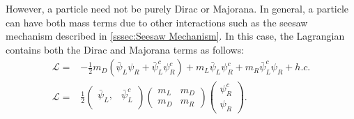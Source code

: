 However, a particle need not be purely Dirac or Majorana. In general, a particle can have both mass terms due to other interactions such as the seesaw mechanism described in \autoref{sssec:Seesaw Mechanism}. In this case, the Lagrangian contains both the Dirac and Majorana terms as follows:
\begin{align}
\mathcal{L} = & -\frac{1}{2}m_D(\bar{\psi}_L\psi_R+\bar{\psi}^c_L\psi^c_R)+m_L\bar{\psi}_L\psi^c_R+m_R\bar{\psi}^c_L\psi_R +h.c. \\
\mathcal{L} = &\frac{1}{2} \begin{pmatrix}
\bar{\psi}_L,& \bar{\psi}^c_L \\
\end{pmatrix} \begin{pmatrix}
m_L & m_D \\
m_D & m_R
\end{pmatrix}
\begin{pmatrix}
\psi^c_R \\
\psi_R
\end{pmatrix}.
\label{eq:DiracAndMajoranaMass}
\end{align}

